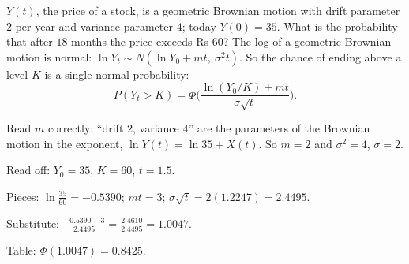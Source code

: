\begin{problem}[Q5(b)]
$Y(t)$, the price of a stock, is a geometric Brownian motion with drift parameter $2$ per year and variance parameter $4$; today $Y(0)=35$. What is the probability that after $18$ months the price exceeds Rs $60$?
\cardsays The log of a geometric Brownian motion is normal: $\ln Y_t\sim N(\ln Y_0+mt,\ \sigma^2t)$. So the chance of ending above a level $K$ is a single normal probability:
\[
P(Y_t>K)=\Phi\Big(\frac{\ln(Y_0/K)+mt}{\sigma\sqrt t}\Big).
\]
\working
\begin{steps}
\item Read $m$ correctly: ``drift $2$, variance $4$'' are the parameters of the Brownian motion in the exponent, $\ln Y(t)=\ln35+X(t)$. So $m=2$ and $\sigma^2=4$, $\sigma=2$.
\item Read off: $Y_0=35$, $K=60$, $t=1.5$.
\item Pieces: $\ln\frac{35}{60}=-0.5390$; $mt=3$; $\sigma\sqrt t=2(1.2247)=2.4495$.
\item Substitute: $\frac{-0.5390+3}{2.4495}=\frac{2.4610}{2.4495}=1.0047$.
\item Table: $\Phi(1.0047)=0.8425$.
\end{steps}
\end{problem}
